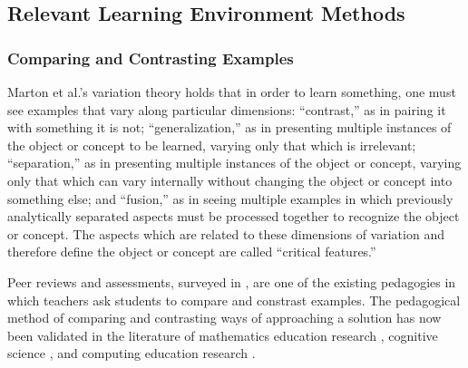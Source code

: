 \documentclass[12pt]{article}
\begin{document}
\subsection{Relevant Learning Environment Methods}

\subsubsection{Comparing and Contrasting Examples}







Marton et al.'s variation theory \cite{Marton03} holds that in order to learn something, one must see examples that vary along particular dimensions: ``contrast,'' as in pairing it with something it is not; ``generalization,'' as in presenting multiple instances of the object or concept to be learned, varying only that which is irrelevant; ``separation,'' as in presenting multiple instances of the object or concept, varying only that which can vary internally without changing the object or concept into something else; and ``fusion,'' as in seeing multiple examples in which previously analytically separated aspects must be processed together to recognize the object or concept. The aspects which are related to these dimensions of variation and therefore define the object or concept are called ``critical features.''

Peer reviews and assessments, surveyed in \cite{peerReview98}, are one of the existing pedagogies in which teachers ask students to compare and constrast examples. The pedagogical method of comparing and contrasting ways of approaching a solution has now been validated in the literature of mathematics education research \cite{Star07}, cognitive science \cite{3,12,and13inPatitsas}, and computing education research \cite{Suhonen08, PatitsasICER13}.
\end{document}
